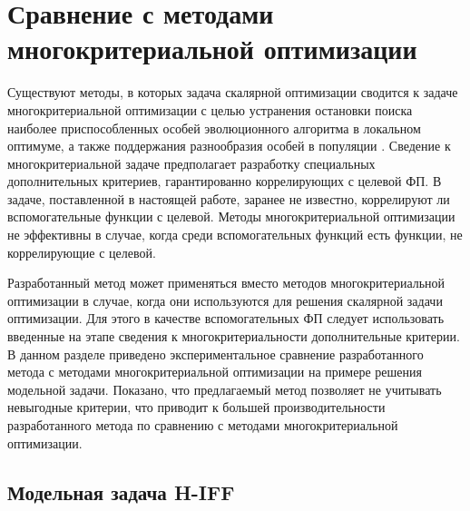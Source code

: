 \chapter{Сравнение с методами многокритериальной оптимизации} 
\label{chapter3}

Существуют методы, в которых задача скалярной оптимизации сводится к задаче многокритериальной оптимизации с целью устранения остановки поиска наиболее приспособленных особей эволюционного алгоритма в локальном оптимуме, а также поддержания разнообразия особей в популяции \cite{mh-iff, single-from-multi, helpers}. Сведение к многокритериальной задаче предполагает разработку специальных дополнительных критериев, гарантированно коррелирующих с целевой ФП. В задаче, поставленной в настоящей работе, заранее не известно, коррелируют ли вспомогательные функции с целевой. Методы многокритериальной оптимизации не эффективны в случае, когда среди вспомогательных функций есть функции, не коррелирующие с целевой.

Разработанный метод может применяться вместо методов многокритериальной оптимизации в случае, когда они используются для решения скалярной задачи оптимизации. Для этого в качестве вспомогательных ФП следует использовать введенные на этапе сведения к многокритериальности дополнительные критерии. В данном разделе приведено экспериментальное сравнение разработанного метода с методами многокритериальной оптимизации на примере решения модельной задачи. Показано, что предлагаемый метод позволяет не учитывать невыгодные критерии, что приводит к большей производительности разработанного метода по сравнению с методами многокритериальной оптимизации.
 
\section{Модельная задача H-IFF}
\label{h-iff}

